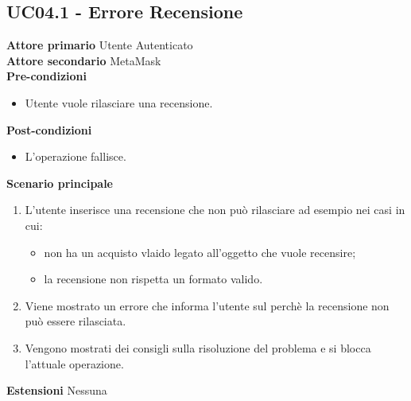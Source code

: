 \subsection{UC04.1 - Errore Recensione}
\textbf{Attore primario} Utente Autenticato \\
\textbf{Attore secondario} MetaMask \\
\textbf{Pre-condizioni}
\begin{itemize}
    \item Utente vuole rilasciare una recensione.
\end{itemize}
\textbf{Post-condizioni}
\begin{itemize}
    \item L'operazione fallisce.
\end{itemize}
\textbf{Scenario principale}
\begin{enumerate}
    \item L'utente inserisce una recensione che non può rilasciare ad esempio nei casi in cui:
    \begin{itemize}
        \item non ha un acquisto vlaido legato all'oggetto che vuole recensire;
        \item la recensione non rispetta un formato valido.
    \end{itemize}
    \item Viene mostrato un errore che informa l'utente sul perchè la recensione non può essere rilasciata.
    \item Vengono mostrati dei consigli sulla risoluzione del problema e si blocca l'attuale operazione.
\end{enumerate}
\textbf{Estensioni} Nessuna
